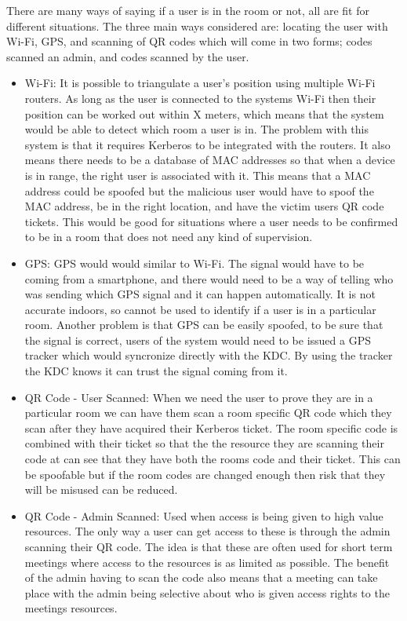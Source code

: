 \documentclass[]{report}   %
\begin{document}
There are many ways of saying if a user is in the room or not, all are fit for different situations. The three main ways considered are: locating the user with Wi-Fi, GPS, and scanning of QR codes which will come in two forms; codes scanned an admin, and codes scanned by the user.
\begin{itemize}

\item Wi-Fi: It is possible to triangulate a user’s position using multiple Wi-Fi routers. As long as the user is connected to the systems Wi-Fi then their position can be worked out within X meters, which means that the system would be able to detect which room a user is in. The problem with this system is that it requires Kerberos to be integrated with the routers. It also means there needs to be a database of MAC addresses so that when a device is in range, the right user is associated with it. This means that a MAC address could be spoofed but the malicious user would have to spoof the MAC address, be in the right location, and have the victim users QR code tickets. This would be good for situations where a user needs to be confirmed to be in a room that does not need any kind of supervision.

\item GPS: GPS would would similar to Wi-Fi. The signal would have to be coming from a smartphone, and there would need to be a way of telling who was sending which GPS signal and it can happen automatically. It is not accurate indoors, so cannot be used to identify if a user is in a particular room. Another problem is that GPS can be easily spoofed, to be sure that the signal is correct, users of the system would need to be issued a GPS tracker which would syncronize directly with the KDC. By using the tracker the KDC knows it can trust the signal coming from it.

\item QR Code - User Scanned: When we need the user to prove they are in a particular room we can have them scan a room specific QR code which they scan after they have acquired their Kerberos ticket. The room specific code is combined with their ticket so that the the resource they are scanning their code at can see that they have both the rooms code and their ticket. This can be spoofable but if the room codes are changed enough then risk that they will be misused can be reduced.

\item QR Code - Admin Scanned: Used when access is being given to high value resources. The only way a user can get access to these is through the admin scanning their QR code. The idea is that these are often used for short term meetings where access to the resources is as limited as possible. The benefit of the admin having to scan the code also means that a meeting can take place with the admin being selective about who is given access rights to the meetings resources.

\end{itemize}
\end{document}
